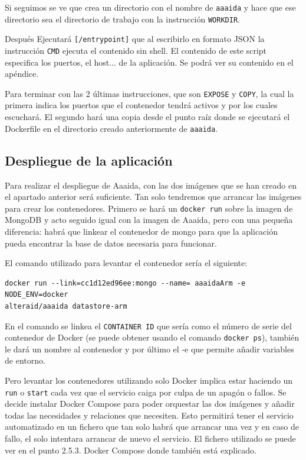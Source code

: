 Si seguimos se ve que crea un directorio con el nombre de \texttt{aaaida} y hace que ese directorio sea el directorio de trabajo con la instrucción \texttt{WORKDIR}.
 
Después Ejecutará \texttt{[/entrypoint]} que al escribirlo en formato JSON la instrucción \texttt{CMD} ejecuta el contenido sin shell. El contenido de este script especifica los puertos, el host... de la aplicación. Se podrá ver su contenido en el apéndice.
 
Para terminar con las 2 últimas instrucciones, que son \texttt{EXPOSE} y \texttt{COPY}, la cual la primera indica los puertos que el contenedor tendrá activos y por los cuales escuchará. El segundo hará una copia desde el punto raíz donde se ejecutará el Dockerfile en el directorio creado anteriormente de \texttt{aaaida}.

\subsection{Despliegue de la aplicación} 

Para realizar el despliegue de Aaaida, con las dos imágenes que se han creado en el apartado anterior será suficiente. Tan solo tendremos que arrancar las imágenes para crear los contenedores. 
Primero se hará un \texttt{docker run} sobre la imagen de MongoDB y acto seguido igual con la imagen de Aaaida, pero con una pequeña diferencia: habrá que linkear el contenedor de mongo para que la aplicación pueda encontrar la base de datos necesaria para funcionar.
\pagebreak 

El comando utilizado para levantar el contenedor sería el siguiente:

\begin{center}
\begin{verbatim}
docker run --link=cc1d12ed96ee:mongo --name= aaaidaArm -e NODE_ENV=docker 
alteraid/aaaida datastore-arm
\end{verbatim}
\end{center}

En el comando se linkea el \texttt{CONTAINER ID} que sería como el número de serie del contenedor de Docker (se puede obtener usando el comando \texttt{docker ps}), también le dará un nombre al contenedor y por último el -e que permite añadir variables de entorno.
\newline 

Pero levantar los contenedores utilizando solo Docker implica estar haciendo un \texttt{run} o \texttt{start} cada vez que el servicio caiga por culpa de un apagón o fallos. Se decide instalar Docker Compose para poder orquestar las dos imágenes y añadir todas las necesidades y relaciones que necesiten. Esto permitirá tener el servicio automatizado en un fichero que tan solo habrá que arrancar una vez y en caso de fallo, el solo intentara arrancar de nuevo el servicio. El fichero utilizado se puede ver en el punto 2.5.3. Docker Compose donde también está explicado. 


